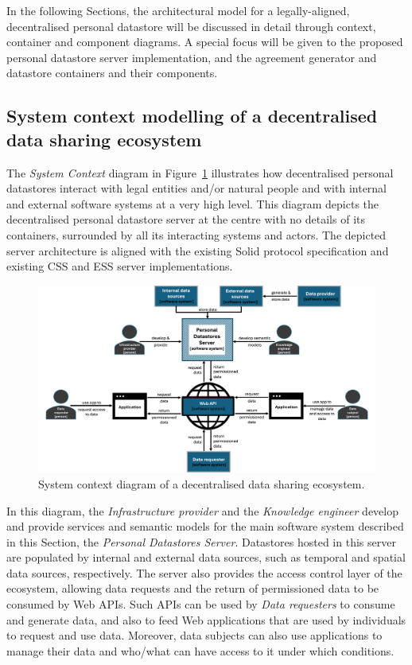 In the following Sections, the architectural model for a legally-aligned, decentralised personal datastore will be discussed in detail through context, container and component diagrams.
A special focus will be given to the proposed personal datastore server implementation, and the agreement generator and datastore containers and their components. 

\subsection{System context modelling of a decentralised data sharing ecosystem}
\label{sec:c4_context}

The \textit{System Context} diagram in Figure~\ref{fig:c4-context} illustrates how decentralised personal datastores interact with legal entities and/or natural people and with internal and external software systems at a very high level.
This diagram depicts the decentralised personal datastore server at the centre with no details of its containers, surrounded by all its interacting systems and actors.
The depicted server architecture is aligned with the existing Solid protocol specification \citep{capadisli_solid_2022} and existing CSS and ESS server implementations.

\begin{figure}[ht]
    \centering
    \includegraphics[width=1\linewidth]{figures//chapter-6/system-context-diagram.png}
    \caption{System context diagram of a decentralised data sharing ecosystem.}
    \label{fig:c4-context}
\end{figure}

In this diagram, the \textit{Infrastructure provider} and the \textit{Knowledge engineer} develop and provide services and semantic models for the main software system described in this Section, the \textit{Personal Datastores Server}.
Datastores hosted in this server are populated by internal and external data sources, such as temporal and spatial data sources, respectively.
The server also provides the access control layer of the ecosystem, allowing data requests and the return of permissioned data to be consumed by Web APIs.
Such APIs can be used by \textit{Data requesters} to consume and generate data, and also to feed Web applications that are used by individuals to request and use data.
Moreover, data subjects can also use applications to manage their data and who/what can have access to it under which conditions.

